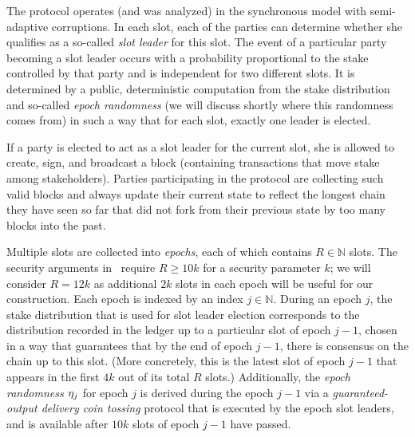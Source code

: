 The protocol operates (and was analyzed) in the synchronous model with
semi-adaptive corruptions. %
%
In each slot, each of the parties can determine whether she qualifies as a
so-called \emph{slot leader} for this slot.  The event of a particular party
becoming a slot leader occurs with a probability proportional to the stake
controlled by that party and  is independent for two different slots.
It is determined by a public, deterministic computation from the stake
distribution and so-called \emph{epoch randomness} (we will discuss shortly
where this randomness comes from) in such a way that for each slot, exactly one
leader is elected.

If a party is elected to act as a slot leader for the current slot, she is
allowed to create, sign, and broadcast a block (containing transactions that
move stake among stakeholders).  Parties participating in the protocol are
collecting such valid blocks and always update their current state to reflect
the longest chain they have seen so far that did not fork from their previous
state by too many blocks into the past.

Multiple slots are collected into \textit{epochs}, each of which contains
$R\in \mathbb{N}$ slots. The security arguments in~\cite{C:KRDO17} require $R\geq 10k$
for a security parameter $k$; we will consider $R=12k$ as additional $2k$ slots
in each epoch will be useful for our construction.
Each epoch is indexed by an index $j \in \mathbb{N}$. During an epoch
$j$, the stake distribution that is used for slot leader election corresponds to
the distribution recorded in the ledger up to
a particular slot of epoch $j-1$, chosen in a way that guarantees that by the
end of epoch $j-1$, there is consensus on the chain up to this slot. (More
concretely, this is the latest slot of epoch $j-1$ that appears in the first $4k$
out of its total $R$ slots.)
Additionally, the \emph{epoch randomness $\eta_j$} for epoch $j$ is derived
during the epoch $j-1$ via a \emph{guaranteed-output delivery coin tossing}
protocol
that is executed by the epoch slot leaders,
and is available after $10k$ slots of epoch $j-1$ have passed.

